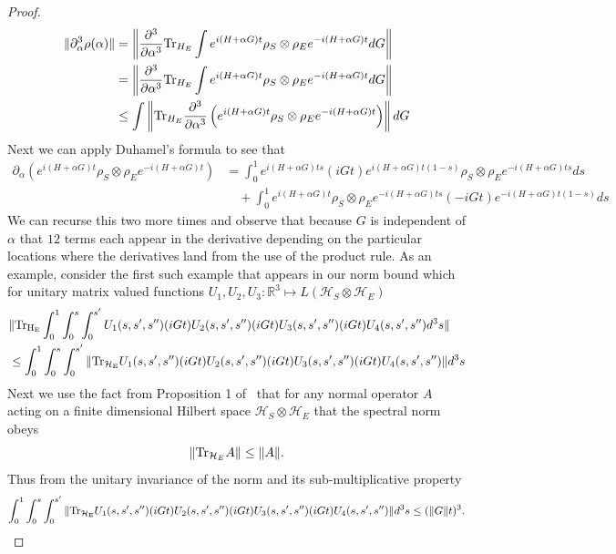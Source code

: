 \documentclass{article}
\newcommand{\hilb}{\mathcal{H}}
\begin{document}
\begin{proof}
\begin{align}
    \|\partial_\alpha^3 \rho(\alpha) \| &= \left\| \frac{\partial^3}{\partial \alpha^3} {\rm Tr}_{H_E} \int e^{i(H+\alpha G)t} \rho_S \otimes \rho_E e^{-i(H+\alpha G)t} dG\right\|\nonumber\\
    &= \left\| \frac{\partial^3}{\partial \alpha^3} {\rm Tr}_{H_E} \int e^{i(H+\alpha G)t} \rho_S \otimes \rho_E e^{-i(H+\alpha G)t} dG\right\|\nonumber\\
    &\le    \int \left\|{\rm Tr}_{H_E}\frac{\partial^3}{\partial \alpha^3}\left( e^{i(H+\alpha G)t} \rho_S \otimes \rho_E e^{-i(H+\alpha G)t}\right) \right\| dG\label{eq:3derivBd}
\end{align}
Next we can apply Duhamel's formula to see that
\begin{align}
    \partial_\alpha \left( e^{i(H+\alpha G)t} \rho_S \otimes \rho_E e^{-i(H+\alpha G)t}\right) &=\int_0^1 e^{i(H+\alpha G)ts} (iGt)e^{i(H+\alpha G)t(1-s)}  \rho_S \otimes \rho_E e^{-i(H+\alpha G)ts}  ds\nonumber\\
    &\quad+\int_0^1  e^{i(H+\alpha G)t}\rho_S \otimes \rho_Ee^{-i(H+\alpha G)ts} (-iGt)e^{-i(H+\alpha G)t(1-s)}  ds
\end{align}
We can recurse this two more times and observe that because $G$ is independent of $\alpha$
that $12$ terms each appear in the derivative depending on the particular locations where the derivatives land from the use of the product rule.  As an example,
consider the first such example that appears in our norm bound which for unitary matrix valued functions $U_1,U_2,U_3 : \mathbb{R}^3 \mapsto L(\hilb_S \otimes \hilb_E)$
\begin{align}
    &\| {\rm Tr_{H_E}} \int_0^1\int_0^{s}\int_0^{s'} U_1(s,s',s'')(iGt)U_2(s,s',s'') (iGt) U_3(s,s',s'') (iGt) U_4(s,s',s'') d^3s\|\nonumber\\
    &\le \int_0^1 \int_0^s \int_0^{s'} \|{\rm Tr_{\hilb_E}}U_1(s,s',s'')(iGt)U_2(s,s',s'') (iGt) U_3(s,s',s'') (iGt) U_4(s,s',s'')\| d^3s
\end{align}
Next we use the fact from Proposition 1 of~\cite{rastegin2012relations} that for any normal operator $A$ acting on a finite dimensional Hilbert space $\hilb_S\otimes \hilb_E$ that the spectral norm obeys
\begin{equation}
    \|{\rm Tr}_{\hilb_E} A\| \le \|A\|.
\end{equation}
Thus from the unitary invariance of the norm and its sub-multiplicative property
\begin{equation}
    \int_0^1 \int_0^s \int_0^{s'} \|{\rm Tr_{\hilb_E}}U_1(s,s',s'')(iGt)U_2(s,s',s'') (iGt) U_3(s,s',s'') (iGt) U_4(s,s',s'')\| d^3s \le (\|G\|t)^3.\label{eq:t3error}

\end{equation}
\end{proof}
\end{document}
